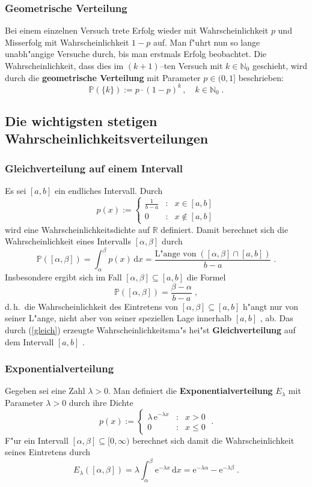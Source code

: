 \documentclass[ngerman,draft,parskip=half,twoside]{scrartcl}
\newcommand*{\R}{\mathbb{R}}      %
\newcommand*{\N}{\mathbb{N}}      %
\newcommand*{\WKM}{\mathbb{P}}      %
\begin{document}
\subsubsection{Geometrische Verteilung}
Bei einem einzelnen Versuch trete Erfolg wieder mit Wahrscheinlichkeit $p$ und Misserfolg
mit Wahrscheinlichkeit $1-p$ auf. Man f"uhrt nun so lange unabh"angige Versuche durch, bis
man erstmals Erfolg beobachtet. Die Wahrscheinlichkeit, dass dies im $(k+1)$--ten Versuch mit
$k\in\N_0$ geschieht, wird durch die \textbf{geometrische Verteilung} mit Parameter $p\in(0,1]$
beschrieben$\colon$
$$
\WKM(\{k\}):= p\cdot(1-p)^k\,,\quad k\in\N_0\;.
$$
\subsection{Die wichtigsten stetigen Wahrscheinlichkeitsverteilungen}

\subsubsection{Gleichverteilung auf einem Intervall}
Es sei $[a,b]$ ein endliches Intervall. Durch
$$
p(x):=\left\{
\begin{array}{ccl}
\frac{1}{b-a} &:& x\in [a,b]\\
 0 &:& x\notin [a,b]
\end{array}
\right.
$$
wird eine Wahrscheinlichkeitsdichte auf $\R$ definiert. Damit berechnet sich die Wahrscheinlichkeit
eines Intervalls $[\alpha,\beta]$ durch
\begin{equation}
\label{gleich}
\WKM([\alpha,\beta])=\int_\alpha^\beta p(x)\,\mathrm dx= \frac{\mbox{L"ange von}\;([\alpha,\beta]\cap[a,b])}
{b-a}\;.
\end{equation}
Insbesondere ergibt sich im Fall $[\alpha,\beta]\subseteq [a,b]$ die Formel
$$
\WKM([\alpha,\beta])= \frac{\beta-\alpha}{b-a}\;,
$$
d.\,h.~die Wahrscheinlichkeit des Eintretens von $[\alpha,\beta]\subseteq[a,b]$
 h"angt nur von seiner L"ange, nicht aber von
seiner speziellen Lage innerhalb $[a,b]$ , ab.
Das durch (\ref{gleich}) erzeugte Wahrscheinlichkeitsma"s hei"st \textbf{Gleichverteilung} auf dem
Intervall $[a,b]$ .
\subsubsection{Exponentialverteilung}
Gegeben sei eine Zahl $\lambda>0$. Man definiert die
\textbf{Exponentialverteilung} $E_\lambda$ mit Parameter $\lambda>0$ durch
ihre Dichte
$$
p(x):=\left\{
\begin{array}{ccr}
\lambda\,\mathrm e^{-\lambda x} &:& x>0\\
0 &:& x\le 0
\end{array}
\right.\;.
$$
F"ur ein Intervall $[\alpha,\beta]\subseteq [0,\infty)$ berechnet sich damit
die Wahrscheinlichkeit seines Eintretens durch
$$
E_\lambda([\alpha,\beta])=\lambda \int_\alpha^\beta \mathrm e^{-\lambda x}\,\mathrm dx
= \mathrm e^{-\lambda\alpha}- \mathrm e^{-\lambda\beta}\;.
$$
\end{document}
